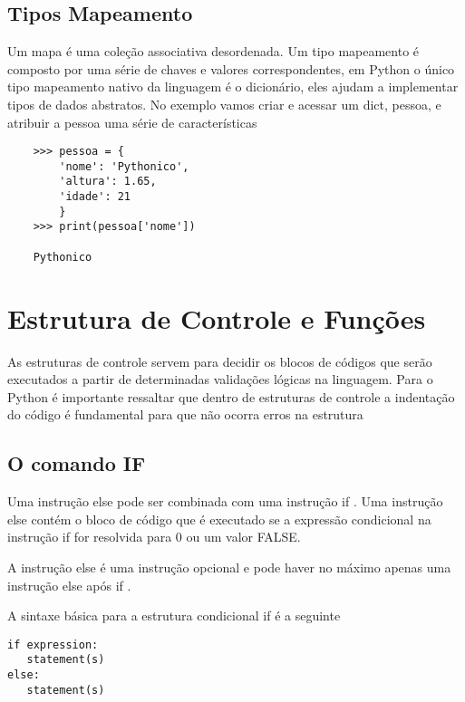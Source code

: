             \subsection{Tipos Mapeamento}
         Um mapa é uma coleção associativa desordenada. Um tipo mapeamento é composto por uma série de chaves e valores correspondentes, em Python o único tipo mapeamento nativo da linguagem é o dicionário, eles ajudam a implementar tipos de dados abstratos. No exemplo vamos criar e acessar um dict, pessoa, e atribuir a pessoa uma série de características \\
         
    \begin{lstlisting}
    >>> pessoa = {
        'nome': 'Pythonico', 
        'altura': 1.65, 
        'idade': 21
        }
    >>> print(pessoa['nome'])
    
    Pythonico
    \end{lstlisting}


    \section{Estrutura de Controle e Fun\c{c}\~{o}es}
    As estruturas de controle servem para decidir os blocos de códigos que serão executados a partir de determinadas validações lógicas na linguagem.
    Para o Python é importante ressaltar que dentro de estruturas de controle a indentação do código é fundamental para que não ocorra erros na estrutura
            \subsection{O comando IF}
    Uma instrução else pode ser combinada com uma instrução if . Uma instrução else contém o bloco de código que é executado se a expressão condicional na instrução if for resolvida para 0 ou um valor FALSE.

    A instrução else é uma instrução opcional e pode haver no máximo apenas uma instrução else após if .

    A sintaxe básica para a estrutura condicional if é a seguinte
    
\begin{lstlisting}
if expression:
   statement(s)
else:
   statement(s)
\end{lstlisting}

